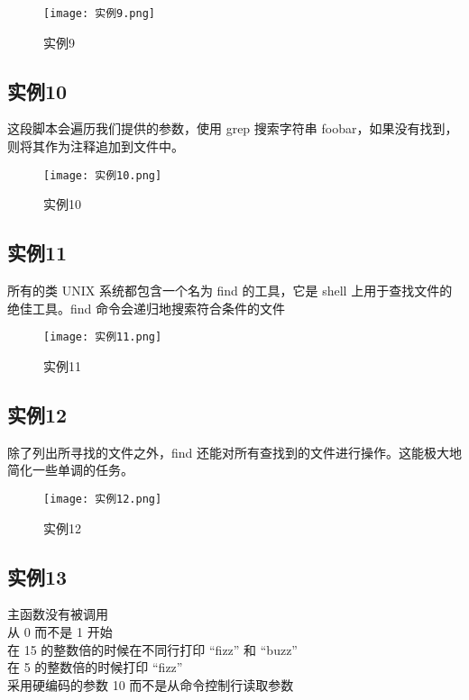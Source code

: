 \documentclass[a4paper, 12pt]{article}
\begin{document}
\begin{figure}[h!]
  \centering
  \texttt{[image: 实例9.png]}
  \caption{实例9}
\end{figure}

\subsection{实例10}
这段脚本会遍历我们提供的参数，使用 grep 搜索字符串 foobar，如果没有找到，则将其作为注释追加到文件中。

\begin{figure}[h!]
  \centering
  \texttt{[image: 实例10.png]}
  \caption{实例10}
\end{figure}

\subsection{实例11}
所有的类 UNIX 系统都包含一个名为 find 的工具，它是 shell 上用于查找文件的绝佳工具。find 命令会递归地搜索符合条件的文件

\begin{figure}[h!]
  \centering
  \texttt{[image: 实例11.png]}
  \caption{实例11}
\end{figure}

\subsection{实例12}
除了列出所寻找的文件之外，find 还能对所有查找到的文件进行操作。这能极大地简化一些单调的任务。

\begin{figure}[h!]
  \centering
  \texttt{[image: 实例12.png]}
  \caption{实例12}
\end{figure}

\subsection{实例13}
主函数没有被调用\\
从 0 而不是 1 开始\\
在 15 的整数倍的时候在不同行打印 “fizz” 和 “buzz”\\
在 5 的整数倍的时候打印 “fizz”\\
采用硬编码的参数 10 而不是从命令控制行读取参数\\\\
\end{document}
